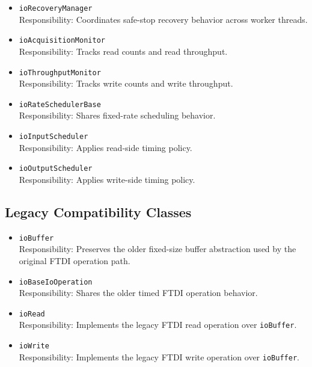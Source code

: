 \begin{itemize}
        \item \texttt{ioRecoveryManager} \\
        Responsibility: Coordinates safe-stop recovery behavior across worker threads.

        \item \texttt{ioAcquisitionMonitor} \\
        Responsibility: Tracks read counts and read throughput.

        \item \texttt{ioThroughputMonitor} \\
        Responsibility: Tracks write counts and write throughput.

        \item \texttt{ioRateSchedulerBase} \\
        Responsibility: Shares fixed-rate scheduling behavior.

        \item \texttt{ioInputScheduler} \\
        Responsibility: Applies read-side timing policy.

        \item \texttt{ioOutputScheduler} \\
        Responsibility: Applies write-side timing policy.
    \end{itemize}

    \subsection{Legacy Compatibility Classes}
    \begin{itemize}
        \item \texttt{ioBuffer} \\
        Responsibility: Preserves the older fixed-size buffer abstraction used by the original FTDI operation path.

        \item \texttt{ioBaseIoOperation} \\
        Responsibility: Shares the older timed FTDI operation behavior.

        \item \texttt{ioRead} \\
        Responsibility: Implements the legacy FTDI read operation over \texttt{ioBuffer}.

        \item \texttt{ioWrite} \\
        Responsibility: Implements the legacy FTDI write operation over \texttt{ioBuffer}.
    \end{itemize}

